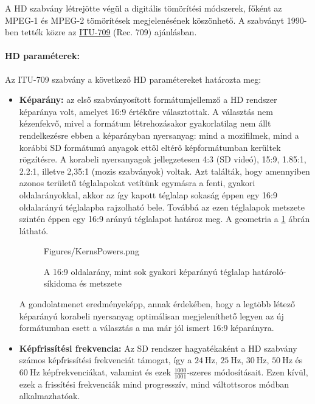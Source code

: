 A HD szabvány létrejötte végül a digitális tömörítési módszerek, főként az MPEG-1 és MPEG-2 tömörítések megjelenésének köszönhető.
A szabványt 1990-ben tették közre az \href{https://www.itu.int/dms_pubrec/itu-r/rec/bt/R-REC-BT.709-6-201506-I!!PDF-E.pdf}{ITU-709} (Rec. 709) ajánlásban.

\paragraph{HD paraméterek:\\}

Az ITU-709 szabvány a következő HD paramétereket határozta meg:
\begin{itemize}
\item \textbf{Képarány:} az első szabványosított formátumjellemző a HD rendszer képaránya volt, amelyet 16:9 értékűre választottak.
A választás nem kézenfekvő, mivel a formátum létrehozásakor gyakorlatilag nem állt rendelkezésre ebben a képarányban nyersanyag: mind a mozifilmek, mind a korábbi SD formátumú anyagok ettől eltérő képformátumban kerültek rögzítésre.
A korabeli nyersanyagok jellegzetesen 4:3 (SD videó), 15:9, 1.85:1, 2.2:1, illetve 2,35:1 (mozis szabványok) voltak.
Azt találták, hogy amennyiben azonos területű téglalapokat vetítünk egymásra a fenti, gyakori oldalarányokkal, akkor az így kapott téglalap sokaság éppen egy 16:9 oldalarányú téglalapba rajzolható bele.
Továbbá az ezen téglalapok metszete szintén éppen egy 16:9 arányú téglalapot határoz meg.
A geometria a \ref{Fig:kerns_powers} ábrán látható.
\begin{figure}[]
	\centering
	\begin{overpic}[width = 0.9 \columnwidth ]{Figures/KernsPowers.png}
	\small
	\end{overpic}
	\caption{A 16:9 oldalarány, mint sok gyakori képarányú téglalap határoló-síkidoma és metszete}
	\label{Fig:kerns_powers}
\end{figure}
A gondolatmenet eredményeképp, annak érdekében, hogy a legtöbb létező képarányú korabeli nyersanyag optimálisan megjeleníthető legyen az új formátumban esett a választás a ma már jól ismert 16:9 képarányra.

\item \textbf{Képfrissítési frekvencia:} Az SD rendszer hagyatékaként a HD szabvány számos képfrissítési frekvenciát támogat, így a $24~\mathrm{Hz}$, $25~\mathrm{Hz}$, $30~\mathrm{Hz}$, $50~\mathrm{Hz}$ és $60~\mathrm{Hz}$ képfrekvenciákat, valamint és ezek $\frac{1000}{1001}$-szeres módosításait.
Ezen kívül, ezek a frissítési frekvenciák mind progresszív, mind váltottsoros módban alkalmazhatóak.


\end{itemize}
